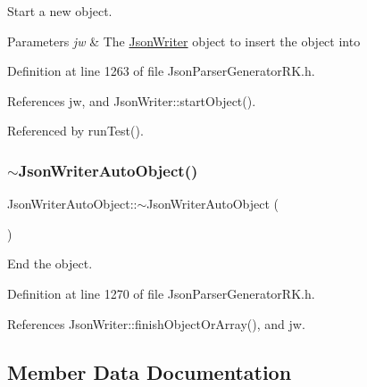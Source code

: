 Start a new object. 


\begin{DoxyParams}{Parameters}
{\em jw} & The \hyperlink{class_json_writer}{Json\+Writer} object to insert the object into \\
\hline
\end{DoxyParams}


Definition at line 1263 of file Json\+Parser\+Generator\+R\+K.\+h.



References jw, and Json\+Writer\+::start\+Object().



Referenced by run\+Test().

\mbox{\label{class_json_writer_auto_object_adb79acd280cd69ae5d0d6afea1c187bc}} 
\subsubsection{\texorpdfstring{$\sim$\+Json\+Writer\+Auto\+Object()}{~JsonWriterAutoObject()}}
{\footnotesize\ttfamily Json\+Writer\+Auto\+Object\+::$\sim$\+Json\+Writer\+Auto\+Object (\begin{DoxyParamCaption}{ }\end{DoxyParamCaption})\hspace{0.3cm}{\ttfamily [inline]}}



End the object. 



Definition at line 1270 of file Json\+Parser\+Generator\+R\+K.\+h.



References Json\+Writer\+::finish\+Object\+Or\+Array(), and jw.



\subsection{Member Data Documentation}
\mbox{\label{class_json_writer_auto_object_a4ffea7af57b2ceb87edd5e7ee08aeefb}} 
